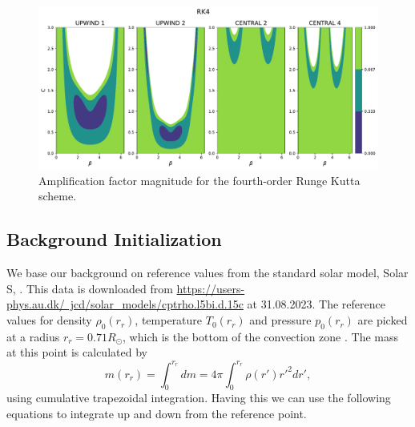 \begin{figure}[htbp]
    \centering
    \includegraphics[width=0.8\linewidth]{./von_neumann_figs/vn_rk4.pdf} %
    \caption{Amplification factor magnitude for the fourth-order Runge Kutta scheme.}
    \label{fig:vn_rk4} %
\end{figure}









\subsection{Background Initialization}

We base our background on reference values from the standard solar model, Solar S, \citep{1996Sci...272.1286C}. This data is downloaded from \href{https://users-phys.au.dk/~jcd/solar_models/cptrho.l5bi.d.15c}{https://users-phys.au.dk/~jcd/solar_models/cptrho.l5bi.d.15c} at 31.08.2023. The reference values for density $\rho_0(r_r)$, temperature $T_0(r_r)$ and pressure $p_0(r_r)$ are picked at a radius $r_r=0.71R_{\odot}$, which is the bottom of the convection zone \citep{1991ApJ...378..413C}. The mass at this point is calculated by
    \begin{equation}
        m(r_r)=\int_0^{r_r} dm = 4\pi \int_0^{r_r} \rho(r')r'^2 dr',
    \end{equation}
using cumulative trapezoidal integration. Having this we can use the following equations to integrate up and down from the reference point.

